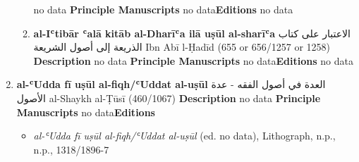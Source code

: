 \documentclass{article}
\begin{document}
\begin{enumerate}
\begin{enumerate}
        no data
        \newline
        \newline
    \textbf{Principle Manuscripts}
\newline
no data\newline\textbf{Editions}
\newline
no data\newline
      \item \textbf{al-Iʿtibār ʿalā kitāb al-Dharīʿa ilā uṣūl al-sharīʿa}
        \newline
        \textarabic{الاعتبار على كتاب الذريعة إلى أصول الشريعة}
        \newline
        Ibn Abī l-Ḥadīd
        \newline
        (655 or 656/1257 or 1258)
        \newline
        \newline
        \textbf{Description}
        \newline	
        no data
        \newline
        \newline
    \textbf{Principle Manuscripts}
\newline
no data\newline\textbf{Editions}
\newline
no data\newline
\end{enumerate}

      \item \textbf{al-ʿUdda fī uṣūl al-fiqh/ʿUddat al-uṣūl}
        \newline
        \textarabic{العدة في أصول الفقه - عدة الأصول}
        \newline
        al-Shaykh al-Ṭūsī
        \newline
        (460/1067)
        \newline
        \newline
        \textbf{Description}
        \newline	
        no data
        \newline
        \newline
    \textbf{Principle Manuscripts}
\newline
no data\newline\textbf{Editions}
\begin{itemize}
        \item \emph{al-ʿUdda fī uṣūl al-fiqh/ʿUddat al-uṣūl} (ed. no data), Lithograph, n.p., n.p., 1318/1896-7
        

\end{itemize}
\end{enumerate}
\end{document}
